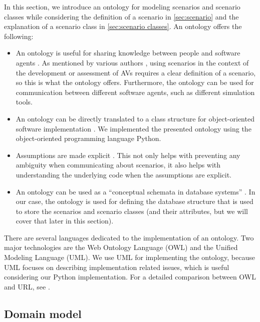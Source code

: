 In this section, we introduce an ontology for modeling scenarios and scenario classes while considering the definition of a scenario in \cref{sec:scenario} and the explanation of a scenario class in \cref{sec:scenario classes}. An ontology offers the following:
\begin{itemize}
	\item An ontology is useful for sharing knowledge between people and software agents \cite{vanDamPhDThesis2009, noy2001ontology}. As mentioned by various authors \cite{stellet2015taxonomy, Helmer2017safety, alvarez2017prospective, zofka2015datadrivetrafficscenarios, aparicio2013pre, lesemann2011test, putz2017pegasus, geyer2014, ulbrich2015}, using scenarios in the context of the development or assessment of AVs requires a clear definition of a scenario, so this is what the ontology offers. Furthermore, the ontology can be used for communication between different software agents, such as different simulation tools.
	\item An ontology can be directly translated to a class structure for object-oriented software implementation \cite{vanDamPhDThesis2009}. We implemented the presented ontology using the object-oriented programming language Python.
	\item Assumptions are made explicit \cite{noy2001ontology}. This not only helps with preventing any ambiguity when communicating about scenarios, it also helps with understanding the underlying code when the assumptions are explicit.
	\item An ontology can be used as a ``conceptual schemata in database systems'' \cite{gruber1993ontology}. In our case, the ontology is used for defining the database structure that is used to store the scenarios and scenario classes (and their attributes, but we will cover that later in this section).
\end{itemize}

There are several languages dedicated to the implementation of an ontology. Two major technologies are the Web Ontology Language (OWL) and the Unified Modeling Language (UML). We use UML for implementing the ontology, because UML focuses on describing implementation related issues, which is useful considering our Python implementation. For a detailed comparison between OWL and URL, see \cite{kiko2005detailed}.

\subsection{Domain model}
\label{sec:domain model}

